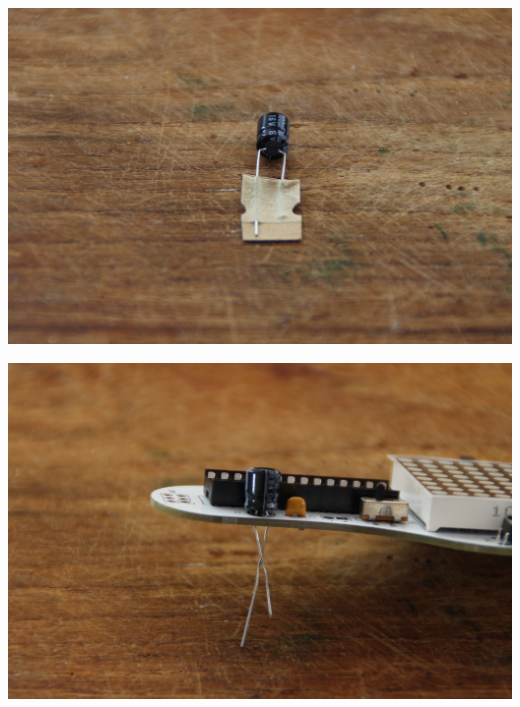 \documentclass{article}
\begin{document}
\begin{minipage}[b]{0.5\textwidth}
	\includegraphics[width=\textwidth]{Bilder2023/IMG_8382.JPG}
\end{minipage}
\begin{minipage}[b]{0.5\textwidth}
	\includegraphics[width=\textwidth]{Bilder2023/IMG_8383.JPG}
\end{minipage}

\vspace{0.5cm}
\end{document}

